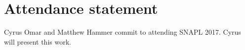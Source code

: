 \documentclass[letterpaper,USenglish]{lipics-v2016}
\begin{document}
%


\section{Attendance statement}

Cyrus Omar and Matthew Hammer commit to attending SNAPL 2017.
%
Cyrus will present this work.

\end{document}
